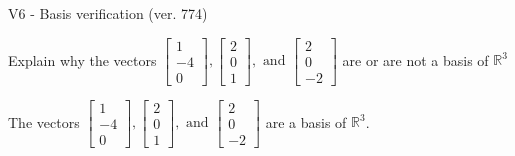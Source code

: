 \begin{exercise}
  \begin{exerciseTitle}V6 - Basis verification (ver. 774)\end{exerciseTitle}
  \begin{exerciseStatement}
    Explain why the vectors \(\left[\begin{array}{r}
1 \\
-4 \\
0
\end{array}\right] , \left[\begin{array}{r}
2 \\
0 \\
1
\end{array}\right] , \text{ and } \left[\begin{array}{r}
2 \\
0 \\
-2
\end{array}\right]\) are or are not a basis of \(\mathbb{R}^3\)	


  \end{exerciseStatement}
  \begin{exerciseAnswer}
   The vectors \(\left[\begin{array}{r}
1 \\
-4 \\
0
\end{array}\right] , \left[\begin{array}{r}
2 \\
0 \\
1
\end{array}\right] , \text{ and } \left[\begin{array}{r}
2 \\
0 \\
-2
\end{array}\right]\) 
  	 are  a basis of \(\mathbb{R}^3\).
  


  \end{exerciseAnswer}
\end{exercise}